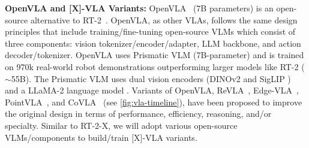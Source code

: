 \begin{table}
\centering
\vspace{-2ex}
\caption{{\footnotesize VLMs for RT-2-[X] and [X]-VLA Variants.}}
\label{tab:VLMs}
\vspace{-2ex}
\vspace{-2ex}
\end{table}
\noindent\textbf{{} OpenVLA and [X]-VLA Variants:} 
OpenVLA~\cite{kim2024openvla} (7B parameters)
is an open-source alternative to RT-2~\cite{rt-2}. %
OpenVLA, as other VLAs, follows the same design principles that include training/fine-tuning open-source VLMs which consist of three components: vision tokenizer/encoder/adapter, LLM backbone, and action decoder/tokenizer. 
OpenVLA uses Prismatic VLM (7B-parameter) and is trained on 970k real-world robot demonstrations outperforming larger models like RT-2 ($\sim$55B). The Prismatic VLM uses dual vision encoders (DINOv2 \cite{oquab2023dinov2} and SigLIP \cite{zhai2023sigmoid}) and a LLaMA-2 language model \cite{touvron2023llama}.
Variants of OpenVLA, \eg  ReVLA~\cite{dey2024revla}, Edge-VLA~\cite{budzianowski20edgevla}, PointVLA~\cite{li2025pointvla}, and CoVLA~\cite{arai2025covla} (see \autoref{fig:vla-timeline}), have been proposed to improve the original design in terms of performance, efficiency, reasoning, and/or specialty.
Similar to RT-2-X, we will adopt various open-source VLMs/components to build/train [X]-VLA variants.


